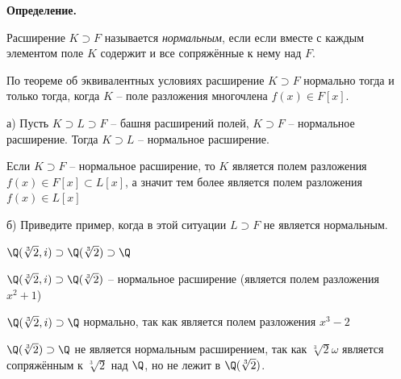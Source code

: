 \textbf{Определение.}

Расширение $K \supset F$ называется \textit{нормальным}, если
если вместе с каждым элементом поле $K$ содержит и все
сопряжённые к нему над $F$.

По теореме об эквивалентных условиях
расширение $K \supset F$ нормально тогда и только тогда,
когда $K$ -- поле разложения многочлена $f(x) \in F[x]$.

а) Пусть $K \supset L \supset F$ -- башня расширений полей, 
$K \supset F$ -- нормальное расширение. 
Тогда $K \supset L$ -- нормальное расширение. 

Если $K \supset F$ -- нормальное расширение, то
$K$ является полем разложения $f(x) \in F[x] \subset L[x]$, а значит
тем более является полем разложения $f(x) \in L[x]$

б) Приведите пример, когда в этой ситуации $L \supset F$ 
не является нормальным.

$\Q(\sqrt[3]{2}, i) \supset \Q(\sqrt[3]{2}) \supset \Q$

$\Q(\sqrt[3]{2}, i) \supset \Q(\sqrt[3]{2})$ -- нормальное расширение
(является полем разложения $x^2 + 1$)

$\Q(\sqrt[3]{2}, i) \supset \Q$ нормально, так как является полем
разложения $x^3 - 2$

$\Q(\sqrt[3]{2}) \supset \Q$ не является нормальным расширением,
так как $\sqrt[3]{2} \omega$ является сопряжённым к $\sqrt[3]{2}$
над $\Q$, но не лежит в $\Q(\sqrt[3]{2})$.

